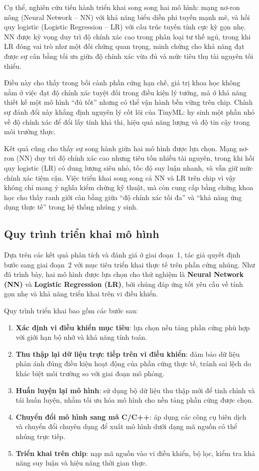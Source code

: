 Cụ thể, nghiên cứu tiến hành triển khai song song hai mô hình: mạng nơ-ron nông (Neural Network – NN) với khả năng biểu diễn phi tuyến mạnh mẽ, và hồi quy logistic (Logistic Regression – LR) với cấu trúc tuyến tính cực kỳ gọn nhẹ. NN được kỳ vọng duy trì độ chính xác cao trong phân loại tư thế ngủ, trong khi LR đóng vai trò như một đối chứng quan trọng, minh chứng cho khả năng đạt được sự cân bằng tối ưu giữa độ chính xác vừa đủ và mức tiêu thụ tài nguyên tối thiểu.  

Điều này cho thấy trong bối cảnh phần cứng hạn chế, giá trị khoa học không nằm ở việc đạt độ chính xác tuyệt đối trong điều kiện lý tưởng, mà ở khả năng thiết kế một mô hình “đủ tốt” nhưng có thể vận hành bền vững trên chip. Chính sự đánh đổi này khẳng định nguyên lý cốt lõi của TinyML: hy sinh một phần nhỏ về độ chính xác để đổi lấy tính khả thi, hiệu quả năng lượng và độ tin cậy trong môi trường thực.  

Kết quả cũng cho thấy sự song hành giữa hai mô hình được lựa chọn. Mạng nơ-ron (NN) duy trì độ chính xác cao nhưng tiêu tốn nhiều tài nguyên, trong khi hồi quy logistic (LR) có dung lượng siêu nhỏ, tốc độ suy luận nhanh, và vẫn giữ mức chính xác tiệm cận. Việc triển khai song song cả NN và LR trên chip vì vậy không chỉ mang ý nghĩa kiểm chứng kỹ thuật, mà còn cung cấp bằng chứng khoa học cho thấy ranh giới cân bằng giữa “độ chính xác tối đa” và “khả năng ứng dụng thực tế” trong hệ thống nhúng y sinh.


\subsection{Quy trình triển khai mô hình}


Dựa trên các kết quả phân tích và đánh giá ở giai đoạn~1, 
tác giả quyết định bước sang giai đoạn~2 với mục tiêu triển khai thực tế trên phần cứng nhúng. 
Như đã trình bày, hai mô hình được lựa chọn cho thử nghiệm là \textbf{Neural Network (NN)} 
và \textbf{Logistic Regression (LR)}, bởi chúng đáp ứng tốt yêu cầu về tính gọn nhẹ và khả năng triển khai trên vi điều khiển.  

Quy trình triển khai bao gồm các bước sau:  
\begin{enumerate}
    \item \textbf{Xác định vi điều khiển mục tiêu}: lựa chọn nền tảng phần cứng phù hợp với giới hạn bộ nhớ và khả năng tính toán.  
    \item \textbf{Thu thập lại dữ liệu trực tiếp trên vi điều khiển}: đảm bảo dữ liệu phản ánh đúng điều kiện hoạt động của phần cứng thực tế, tránh sai lệch do khác biệt môi trường so với giai đoạn mô phỏng.  
    \item \textbf{Huấn luyện lại mô hình}: sử dụng bộ dữ liệu thu thập mới để tinh chỉnh và tái huấn luyện, nhằm tối ưu hóa mô hình cho nền tảng phần cứng được chọn.  
    \item \textbf{Chuyển đổi mô hình sang mã C/C++}: áp dụng các công cụ biên dịch và chuyển đổi chuyên dụng để xuất mô hình dưới dạng mã nguồn có thể nhúng trực tiếp.  
    \item \textbf{Triển khai trên chip}: nạp mã nguồn vào vi điều khiển, bộ lọc, kiểm tra khả năng suy luận và hiệu năng thời gian thực.  
\end{enumerate}

